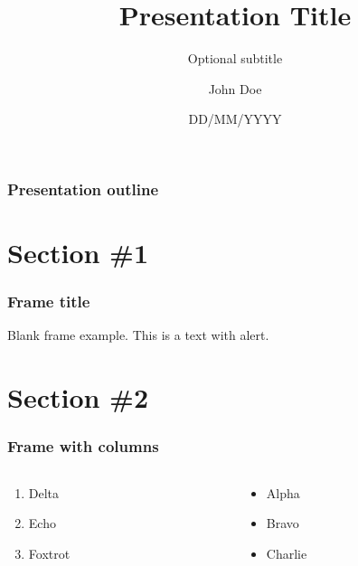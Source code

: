 \documentclass[aspectratio=169, 12pt]{beamer}
\title[Small Title]{Presentation Title}
\subtitle{Optional subtitle}
\date{DD/MM/YYYY}
\author[Doe]{John Doe\inst{1}}
\institute[UoE]{\inst{1} Template Department\\ University of Examples}
\begin{document}

\begin{frame}
    \titlepage
\end{frame}

\begin{frame}
    \frametitle{Presentation outline}
    \tableofcontents
\end{frame}

\section{Section \#1}

\begin{frame}
    \frametitle{Frame title}
    Blank frame example.
    This is a \alert{text with alert}.
\end{frame}

\section{Section \#2}

\begin{frame}
    \frametitle{Frame with columns}
    \begin{columns}[c]
        \begin{column}{0.49\textwidth}
            \begin{enumerate}
                \item Delta
                \item Echo
                \item Foxtrot
            \end{enumerate}
        \end{column}
        \begin{column}{0.49\textwidth}
            \begin{itemize}
                \item Alpha
                \item Bravo
                \item Charlie
            \end{itemize}
        \end{column}
    \end{columns}
\end{frame}
\end{document}
